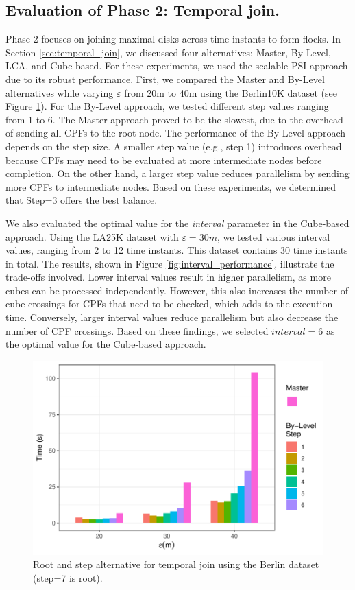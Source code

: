 \subsection{Evaluation of Phase 2: Temporal join.}
Phase 2 focuses on joining maximal disks across time instants to form flocks. In Section \ref{sec:temporal_join}, we discussed four alternatives: Master, By-Level, LCA, and Cube-based. For these experiments, we used the scalable PSI approach due to its robust performance.
First, we compared the Master and By-Level alternatives while varying $\varepsilon$ from 20m to 40m using the Berlin10K dataset (see Figure \ref{fig:step_performance}). For the By-Level approach, we tested different step values ranging from 1 to 6. The Master approach proved to be the slowest, due to the overhead of sending all CPFs to the root node. The performance of the By-Level approach depends on the step size. A smaller step value (e.g., step 1) introduces overhead because CPFs may need to be evaluated at more intermediate nodes before completion. On the other hand, a larger step value reduces parallelism by sending more CPFs to intermediate nodes. Based on these experiments, we determined that Step=3 offers the best balance.

We also evaluated the optimal value for the \textit{interval} parameter in the Cube-based approach. Using the LA25K dataset with $\varepsilon=30m$, we tested various interval values, ranging from 2 to 12 time instants. This dataset contains 30 time instants in total. The results, shown in Figure \ref{fig:interval_performance}, illustrate the trade-offs involved. Lower interval values result in higher parallelism, as more cubes can be processed independently. However, this also increases the number of cube crossings for CPFs that need to be checked, which adds to the execution time. Conversely, larger interval values reduce parallelism but also decrease the number of CPF crossings. Based on these findings, we selected $interval=6$ as the optimal value for the Cube-based approach.

\begin{figure}
    \centering
    \includegraphics[width=0.8\linewidth]{figures/plots/06_step_performance/step_performance.pdf}
    \caption{Root and step alternative for temporal join using the Berlin dataset (step=7 is root).}\label{fig:step_performance}
\end{figure}

